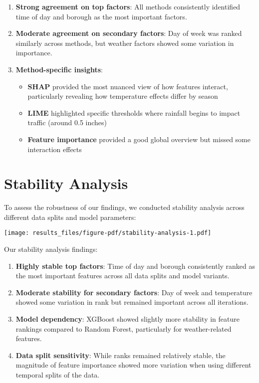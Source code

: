 \documentclass[
  letterpaper,
  DIV=11,
  numbers=noendperiod]{scrreprt}
\providecommand{\tightlist}{%
  \setlength{\itemsep}{0pt}\setlength{\parskip}{0pt}}\usepackage{longtable,booktabs,array}
\begin{document}
\begin{enumerate}
\def\labelenumi{\arabic{enumi}.}
\item
  \textbf{Strong agreement on top factors}: All methods consistently
  identified time of day and borough as the most important factors.
\item
  \textbf{Moderate agreement on secondary factors}: Day of week was
  ranked similarly across methods, but weather factors showed some
  variation in importance.
\item
  \textbf{Method-specific insights}:

  \begin{itemize}
  \tightlist
  \item
    \textbf{SHAP} provided the most nuanced view of how features
    interact, particularly revealing how temperature effects differ by
    season
  \item
    \textbf{LIME} highlighted specific thresholds where rainfall begins
    to impact traffic (around 0.5 inches)
  \item
    \textbf{Feature importance} provided a good global overview but
    missed some interaction effects
  \end{itemize}
\end{enumerate}

\section{Stability Analysis}\label{stability-analysis-1}

To assess the robustness of our findings, we conducted stability
analysis across different data splits and model parameters:

\texttt{[image: results\_files/figure-pdf/stability-analysis-1.pdf]}

Our stability analysis findings:

\begin{enumerate}
\def\labelenumi{\arabic{enumi}.}
\item
  \textbf{Highly stable top factors}: Time of day and borough
  consistently ranked as the most important features across all data
  splits and model variants.
\item
  \textbf{Moderate stability for secondary factors}: Day of week and
  temperature showed some variation in rank but remained important
  across all iterations.
\item
  \textbf{Model dependency}: XGBoost showed slightly more stability in
  feature rankings compared to Random Forest, particularly for
  weather-related features.
\item
  \textbf{Data split sensitivity}: While ranks remained relatively
  stable, the magnitude of feature importance showed more variation when
  using different temporal splits of the data.
\end{enumerate}
\end{document}
